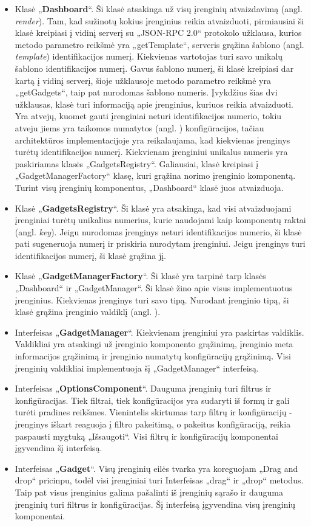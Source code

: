 \documentclass{VUMIFPSbakalaurinis}
\begin{document}
\begin{itemize}
    \item Klasė „\textbf{Dashboard}“. Ši klasė atsakinga už visų įrenginių atvaizdavimą (angl. \textit{render}). Tam, kad sužinotų kokius įrenginius reikia atvaizduoti, pirmiausiai ši klasė kreipiasi į vidinį serverį su „JSON-RPC 2.0“ protokolo užklausa, kurios metodo parametro reikšmė yra „getTemplate“, serveris grąžina šablono (angl. \textit{template}) identifikacijos numerį. Kiekvienas vartotojas turi savo unikalų šablono identifikacijos numerį. Gavus šablono numerį, ši klasė kreipiasi dar kartą į vidinį serverį, šioje užklausoje metodo parametro reikšmė yra „getGadgets“, taip pat nurodomas šablono numeris. Įvykdžius šias dvi užklausas, klasė turi informaciją apie įrenginius, kuriuos reikia atvaizduoti. Yra atvejų, kuomet gauti įrenginiai neturi identifikacijos numerio, tokiu atveju jiems yra taikomos numatytos (angl. ) konfigūracijos, tačiau architektūros implementacijoje yra reikalaujama, kad kiekvienas įrenginys turėtų identifikacijos numerį. Kiekvienam įrenginiui unikalus numeris yra paskiriamas klasės „GadgetsRegistry“. Galiausiai, klasė kreipiasi į „GadgetManagerFactory“ klasę, kuri grąžina norimo įrenginio komponentą. Turint visų įrenginių komponentus, „Dashboard“ klasė juos atvaizduoja.
    \item Klasė „\textbf{GadgetsRegistry}“. Ši klasė yra atsakinga, kad visi atvaizduojami įrenginiai turėtų unikalius numerius, kurie naudojami kaip komponentų raktai (angl. \textit{key}). Jeigu nurodomas įrenginys neturi identifikacijos numerio, ši klasė pati sugeneruoja numerį ir priskiria nurodytam įrenginiui. Jeigu įrenginys turi identifikacijos numerį, ši klasė grąžina jį.
    \item Klasė „\textbf{GadgetManagerFactory}“. Ši klasė yra tarpinė tarp klasės „Dashboard“ ir „GadgetManager“. Ši klasė žino apie visus implementuotus įrenginius. Kiekvienas įrenginys turi savo tipą. Nurodant įrenginio tipą, ši klasė grąžina įrenginio valdiklį (angl. ). 
    \item Interfeisas „\textbf{GadgetManager}“. Kiekvienam įrenginiui yra paskirtas valdiklis. Valdikliai yra atsakingi už įrenginio komponento grąžinimą, įrenginio meta informacijos grąžinimą ir įrenginio numatytų konfigūracijų grąžinimą. Visi įrenginių valdikliai implementuoja šį „GadgetManager“ interfeisą.
    \item Interfeisas „\textbf{OptionsComponent}“. Dauguma įrenginių turi filtrus ir konfigūracijas. Tiek filtrai, tiek konfigūracijos yra sudaryti iš formų ir gali turėti pradines reikšmes. Vienintelis skirtumas tarp filtrų ir konfigūracijų - įrenginys iškart reaguoja į filtro pakeitimą, o pakeitus konfigūraciją, reikia paspausti mygtuką „Išsaugoti“. Visi filtrų ir konfigūracijų komponentai įgyvendina šį interfeisą.
    \item Interfeisas „\textbf{Gadget}“. Visų įrenginių eilės tvarka yra koreguojam „Drag and drop“ pricinpu, todėl visi įrenginiai turi Interfeisas „drag“ ir „drop“ metodus. Taip pat visus įrenginius galima pašalinti iš įrenginių sąrašo ir dauguma įrenginių turi filtrus ir konfigūracijas. Šį interfeisą įgyvendina visų įrenginių komponentai.
\end{itemize}
\end{document}

